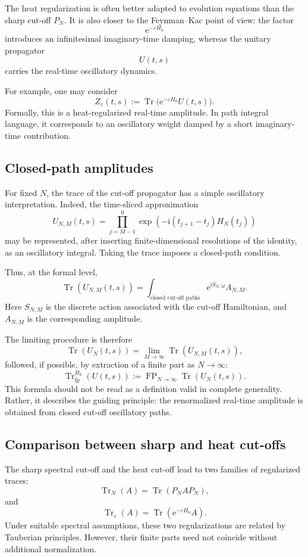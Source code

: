 \documentclass[11pt]{amsart}
\theoremstyle{plain}
\theoremstyle{definition}
\theoremstyle{remark}
\newcommand{\Tr}{\operatorname{Tr}}
\newcommand{\FP}{\operatorname{FP}}
\newcommand{\ii}{\mathrm i}
\newcommand{\ee}{\mathrm e}
\begin{document}
The heat regularization is often better adapted to evolution equations
than the sharp cut-off \(P_N\).  It is also closer to the
Feynman--Kac point of view: the factor
\[
        \ee^{-\varepsilon H_0}
\]
introduces an infinitesimal imaginary-time damping, whereas the
unitary propagator
\[
        U(t,s)
\]
carries the real-time oscillatory dynamics.

For example, one may consider
\[
        Z_\varepsilon(t,s)
        :=
        \Tr\big(\ee^{-\varepsilon H_0}U(t,s)\big).
\]
Formally, this is a heat-regularized real-time amplitude.  In path
integral language, it corresponds to an oscillatory weight damped by a
short imaginary-time contribution.

\subsection{Closed-path amplitudes}

For fixed \(N\), the trace of the cut-off propagator has a simple
oscillatory interpretation.  Indeed, the time-sliced approximation
\[
        U_{N,M}(t,s)
        =
        \prod_{j=M-1}^{0}
        \exp\left(
        -\ii(t_{j+1}-t_j)H_N(t_j)
        \right)
\]
may be represented, after inserting finite-dimensional resolutions of
the identity, as an oscillatory integral.  Taking the trace imposes a
closed-path condition.

Thus, at the formal level,
\[
        \Tr(U_{N,M}(t,s))
        =
        \int_{\text{closed cut-off paths}}
        \ee^{\ii S_{N,M}}
        A_{N,M}.
\]
Here \(S_{N,M}\) is the discrete action associated with the cut-off
Hamiltonian, and \(A_{N,M}\) is the corresponding amplitude.

The limiting procedure is therefore
\[
        \Tr(U_N(t,s))
        =
        \lim_{M\to\infty}
        \Tr(U_{N,M}(t,s)),
\]
followed, if possible, by extraction of a finite part as \(N\to\infty\):
\[
        \Tr_{\mathrm{fp}}^{H_0}(U(t,s))
        :=
        \FP_{N\to\infty}\Tr(U_N(t,s)).
\]
This formula should not be read as a definition valid in complete
generality.  Rather, it describes the guiding principle: the
renormalized real-time amplitude is obtained from closed cut-off
oscillatory paths.

\subsection{Comparison between sharp and heat cut-offs}

The sharp spectral cut-off and the heat cut-off lead to two families of
regularized traces:
\[
        \Tr_N(A)=\Tr(P_NAP_N),
\]
and
\[
        \Tr_\varepsilon(A)=\Tr(\ee^{-\varepsilon H_0}A).
\]
Under suitable spectral assumptions, these two regularizations are
related by Tauberian principles.  However, their finite parts need not
coincide without additional normalization.
\end{document}
